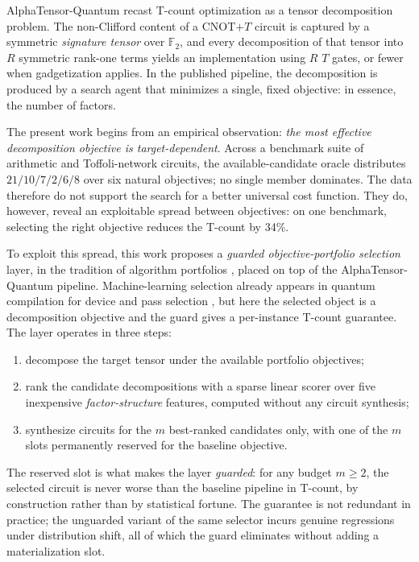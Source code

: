\documentclass{cbctq}
\begin{document}
AlphaTensor-Quantum \cite{ruiz2025} recast T-count optimization as a tensor decomposition problem. The non-Clifford content of a {CNOT}$+T$ circuit is captured by a symmetric \emph{signature tensor} over $\mathbb{F}_2$, and every decomposition of that tensor into $R$ symmetric rank-one terms yields an implementation using $R$ $T$ gates, or fewer when gadgetization applies. In the published pipeline, the decomposition is produced by a search agent that minimizes a single, fixed objective: in essence, the number of factors.

The present work begins from an empirical observation: \emph{the most effective decomposition objective is target-dependent}. Across a benchmark suite of arithmetic and Toffoli-network circuits, the available-candidate oracle distributes $21/10/7/2/6/8$ over six natural objectives; no single member dominates. The data therefore do not support the search for a better universal cost function. They do, however, reveal an exploitable spread between objectives: on one benchmark, selecting the right objective reduces the T-count by 34\%.

To exploit this spread, this work proposes a \emph{guarded objective-portfolio selection} layer, in the tradition of algorithm portfolios \cite{rice1976,xu2008}, placed on top of the AlphaTensor-Quantum pipeline. Machine-learning selection already appears in quantum compilation for device and pass selection \cite{quetschlich2024}, but here the selected object is a decomposition objective and the guard gives a per-instance T-count guarantee. The layer operates in three steps:

\begin{enumerate}
    \item decompose the target tensor under the available portfolio objectives;
    \item rank the candidate decompositions with a sparse linear scorer over five inexpensive \emph{factor-structure} features, computed without any circuit synthesis;
    \item synthesize circuits for the $m$ best-ranked candidates only, with one of the $m$ slots permanently reserved for the baseline objective.
\end{enumerate}

The reserved slot is what makes the layer \emph{guarded}: for any budget $m\ge 2$, the selected circuit is never worse than the baseline pipeline in T-count, by construction rather than by statistical fortune. The guarantee is not redundant in practice; the unguarded variant of the same selector incurs genuine regressions under distribution shift, all of which the guard eliminates without adding a materialization slot.
\end{document}
